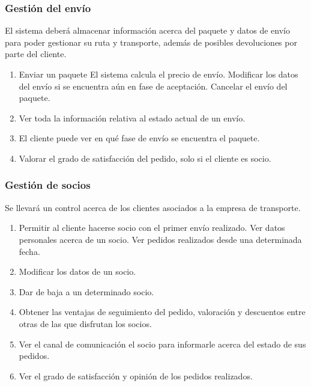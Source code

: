 \subsubsection{Gestión del envío}	
El sistema deberá almacenar información acerca del paquete y datos de envío para poder gestionar su ruta y transporte, además de posibles devoluciones por parte del cliente. 
\begin{enumerate}
	\item Enviar un paquete
	\subitem El sistema calcula el precio de envío.
	\subitem Modificar los datos del envío si se encuentra aún en fase de aceptación.
	\subitem Cancelar el envío del paquete.
	
	\item Ver toda la información relativa al estado actual de un envío.
	\item El cliente puede ver en qué fase de envío se encuentra el paquete.
	\item Valorar el grado de satisfacción del pedido, solo si el cliente es socio.
	
\end{enumerate}

\subsubsection{Gestión de socios}
Se llevará un control acerca de los clientes asociados a la empresa de transporte.
\begin{enumerate}
	\item Permitir al cliente hacerse socio con el primer envío realizado.
	\subitem Ver datos personales acerca de un socio.
	\subitem Ver pedidos realizados desde una determinada fecha.
	\item Modificar los datos de un socio.
	\item Dar de baja a un determinado socio.
	\item Obtener las ventajas de seguimiento del pedido, valoración y descuentos entre otras de las que disfrutan los socios.
	\item Ver el canal de comunicación  el socio para informarle acerca del estado de sus pedidos.
	\item Ver el grado de satisfacción y opinión de los pedidos realizados.
	
\end{enumerate}


